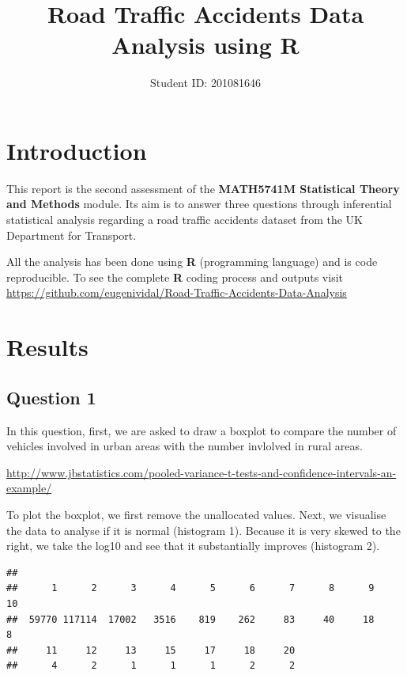 \documentclass[]{article}
\title{Road Traffic Accidents Data Analysis using R}
\author{Student ID: 201081646}
\date{}
\newenvironment{Shaded}{\begin{snugshade}}{\end{snugshade}}
\newcommand{\KeywordTok}[1]{\textcolor[rgb]{0.13,0.29,0.53}{\textbf{{#1}}}}
\newcommand{\CommentTok}[1]{\textcolor[rgb]{0.56,0.35,0.01}{\textit{{#1}}}}
\newcommand{\NormalTok}[1]{{#1}}
\begin{document}
\maketitle

\section{Introduction}\label{introduction}

This report is the second assessment of the \textbf{MATH5741M
Statistical Theory and Methods} module. Its aim is to answer three
questions through inferential statistical analysis regarding a road
traffic accidents dataset from the UK Department for Transport.

All the analysis has been done using \textbf{R} (programming language)
and is code reproducible. To see the complete \textbf{R} coding process
and outputs visit
\url{https://github.com/eugenividal/Road-Traffic-Accidents-Data-Analysis}

\section{Results}\label{results}

\subsection{Question 1}\label{question-1}

In this question, first, we are asked to draw a boxplot to compare the
number of vehicles involved in urban areas with the number invlolved in
rural areas.

\url{http://www.jbstatistics.com/pooled-variance-t-tests-and-confidence-intervals-an-example/}

To plot the boxplot, we first remove the unallocated values. Next, we
visualise the data to analyse if it is normal (histogram 1). Because it
is very skewed to the right, we take the log10 and see that it
substantially improves (histogram 2).

\begin{Shaded}
\end{Shaded}

\begin{verbatim}
## 
##      1      2      3      4      5      6      7      8      9     10 
##  59770 117114  17002   3516    819    262     83     40     18      8 
##     11     12     13     15     17     18     20 
##      4      2      1      1      1      2      2
\end{verbatim}
\end{document}
